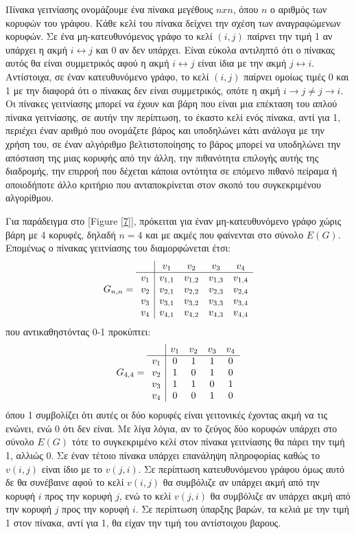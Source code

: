 Πίνακα γειτνίασης ονομάζουμε ένα πίνακα μεγέθους $nxn$, όπου $n$ ο αριθμός των κορυφών του γράφου. Κάθε κελί του πίνακα δείχνει την σχέση των αναγραφώμενων κορυφών. Σε ένα μη-κατευθυνόμενος γράφο το κελί $(i, j)$ παίρνει την τιμή 1 αν υπάρχει η ακμή $i \longleftrightarrow j$ και 0 αν δεν υπάρχει. Είναι εύκολα αντιληπτό ότι ο πίνακας αυτός θα είναι συμμετρικός αφού η ακμή $i \longleftrightarrow j$ είναι ίδια με την ακμή $j \longleftrightarrow i$. Αντίστοιχα, σε έναν κατευθυνόμενο γράφο, το κελί $(i, j)$ παίρνει ομοίως τιμές 0 και 1 με την διαφορά ότι ο πίνακας δεν είναι συμμετρικός, οπότε η ακμή $i \rightarrow j \neq j \rightarrow i$. Οι πίνακες γειτνίασης μπορεί να έχουν και βάρη που είναι μια επέκταση του απλού πίνακα γειτνίασης, σε αυτήν την περίπτωση, το έκαστο κελί ενός πίνακα, αντί για 1, περιέχει έναν αριθμό που ονομάζετε βάρος και υποδηλώνει κάτι ανάλογα με την χρήση του, σε έναν αλγόριθμο βελτιστοποίησης το βάρος μπορεί να υποδηλώνει την απόσταση της μιας κορυφής από την άλλη, την πιθανότητα επιλογής αυτής της διαδρομής, την επιρροή που δέχεται κάποια οντότητα σε επόμενο πιθανό πείραμα ή οποιοδήποτε άλλο κριτήριο που ανταποκρίνεται στον σκοπό του συγκεκριμένου αλγορίθμου.

Για παράδειγμα στο [Figure \ref{7}], πρόκειται για έναν μη-κατευθυνόμενο γράφο χώρις βάρη με 4 κορυφές, δηλαδή $n=4$ και με ακμές που φαίνενται στο σύνολο $E(G)$. Επομένως ο πίνακας γειτνίασης του διαμορφώνεται έτσι: 
$$
G_{n,n} = 
 \begin{array}{c|c c c c}
    & v_{1} & v_{2} & v_{3} & v_{4} \\ \hline
    v_{1} & v_{1,1} & v_{1,2} & v_{1,3} & v_{1,4} \\
    v_{2} & v_{2,1} & v_{2,2} &   v_{2,3} & v_{2,4} \\
    v_{3} & v_{3,1} & v_{3,2} & v_{3,3} & v_{3,4} \\
    v_{4} & v_{4,1} & v_{4,2} & v_{4,3} & v_{4,4} 
 \end{array}
 $$
 που αντικαθηστόντας 0-1 προκύπτει: 
 $$
G_{4,4} = 
 \begin{array}{c|c c c c}
    & v_{1} & v_{2} & v_{3} & v_{4} \\ \hline
    v_{1} & 0 & 1 & 1 & 0 \\
    v_{2} & 1 & 0 & 1 & 0 \\
    v_{3} & 1 & 1 & 0 & 1 \\
    v_{4} & 0 & 0 & 1 & 0 
 \end{array}
 $$
όπου 1 συμβολίζει ότι αυτές οι δύο κορυφές είναι γειτονικές έχοντας ακμή να τις ενώνει, ενώ 0 ότι δεν είναι. Με λίγα λόγια, αν το ζεύγος δύο κορυφών υπάρχει στο σύνολο $E(G)$ τότε το συγκεκριμένο κελί στον πίνακα γειτνίασης θα πάρει την τιμή 1, αλλιώς 0. Σε έναν τέτοιο πίνακα υπάρχει επανάληψη πληροφορίας καθώς το $v(i,j)$ είναι ίδιο με το $v(j,i)$. Σε περίπτωση κατευθυνόμενου γράφου όμως αυτό δε θα συνέβαινε αφού το κελί $v(i,j)$ θα συμβόλιζε αν υπάρχει ακμή από την κορυφή $i$ προς την κορυφή $j$, ενώ το κελί $v(j,i)$ θα συμβόλιζε αν υπάρχει ακμή από την κορυφή $j$ προς την κορυφή $i$. Σε περίπτωση ύπαρξης βαρών, τα κελιά με την τιμή 1 στον πίνακα, αντί για 1, θα είχαν την τιμή του αντίστοιχου βαρους. 

